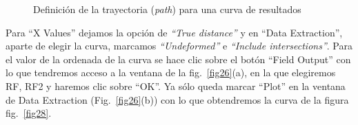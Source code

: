 \documentclass[spanish,a4paper,12pt]{article}
\begin{document}
\begin{enumerate}
\begin{figure}[h!tp]
\caption{Definición de la trayectoria (\emph{path}) para una curva de resultados}
\label{fig22}
\end{figure}
Para ``X Values'' dejamos la opción de \emph{``True distance''} y en ``Data Extraction'', aparte de elegir la curva, marcamos \emph{``Undeformed''} e \emph{``Include intersections''}. 
Para el valor de la ordenada de la curva se hace clic sobre el botón ``Field Output'' con lo que tendremos acceso a la ventana 
de la fig.~\ref{fig26}(a), en la que elegiremos RF, RF2 y haremos clic sobre ``OK''. Ya sólo queda marcar ``Plot''
en la ventana de Data Extraction (Fig.~\ref{fig26}(b)) con lo que obtendremos la curva de la figura fig.~\ref{fig28}.
\begin{figure}[h!tp]
\centering

\end{figure}
\end{enumerate}
\end{document}
